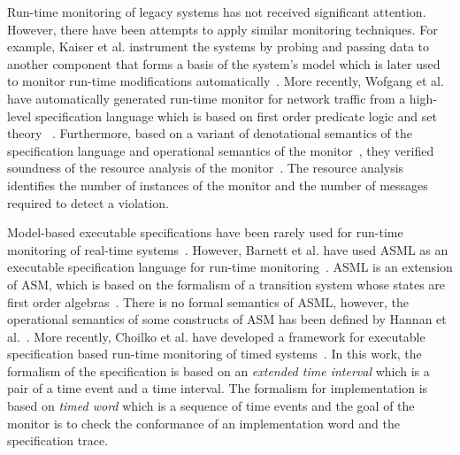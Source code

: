 \documentclass[conference]{IEEEtran}
\begin{document}
Run-time monitoring of legacy systems has not received significant attention. However, there have been attempts to apply similar monitoring techniques. 
For example, Kaiser et al. instrument the systems by probing and passing data to another component that forms a basis of the system's model which is later used to monitor run-time modifications automatically~\cite{Kaiser:2010}. More recently, Wofgang et al. have automatically generated run-time monitor for network traffic from a high-level specification language which is based on first order predicate logic and set theory~ \cite{Wolfgang:2015}. Furthermore, based on a variant of denotational semantics of the specification language and operational semantics of the monitor~\cite{Wolfgang:2012}, they verified soundness of the resource analysis of the monitor~\cite{Wolfgang:2014}. The resource analysis identifies the number of instances of the monitor and the number of messages required to detect a violation. 

Model-based executable specifications have been rarely used for run-time monitoring of real-time systems~\cite{Wasserman:1997}. However, Barnett et al. have used ASML as an executable specification language for run-time monitoring~\cite{Barnett:2003}. ASML is an extension of ASM, which is based on the formalism of a transition system whose states are first order algebras~\cite{ASM:2003}. There is no formal semantics of ASML, however, the operational semantics of some constructs of ASM has been defined by Hannan et al.~\cite{Hannan:1992}. More recently, Choilko et al. have developed a framework for executable specification based run-time monitoring of timed systems~\cite{Choilko:2013}. In this work, the formalism of the specification is based on an \emph{extended time interval} which is a pair of a time event and a time interval. The formalism for implementation is based on \emph{timed word} which is a sequence of time events and the goal of the monitor is to check the conformance of an implementation word and the specification trace.
\end{document}
